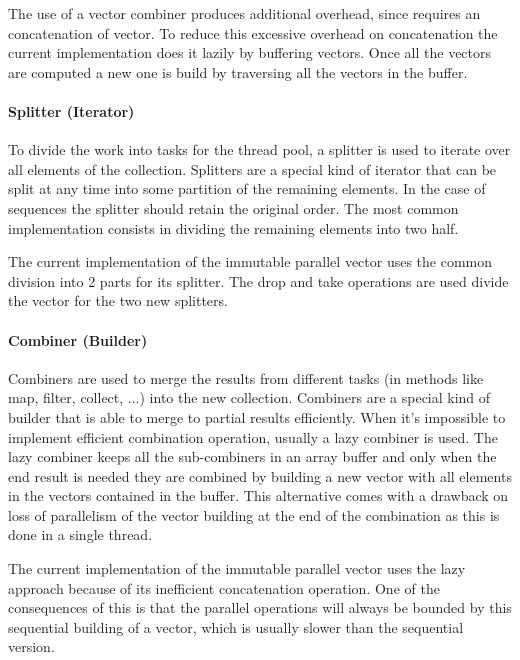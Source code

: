The use of a vector combiner produces additional overhead, since requires an concatenation of vector. To reduce this excessive overhead on concatenation the current implementation does it lazily by buffering vectors. Once all the vectors are computed a new one is build by traversing all the vectors in the buffer. 


\paragraph{Splitter (Iterator)}
To divide the work into tasks for the thread pool, a splitter is used to iterate over all elements of the collection. Splitters are a special kind of iterator that can be split at any time into some partition of the remaining elements. In the case of sequences the splitter should retain the original order. The most common implementation consists in dividing the remaining elements into two half. 

The current implementation of the immutable parallel  vector uses the common division into 2 parts for its splitter. The drop and take operations are used divide the vector for the two new splitters.


\paragraph{Combiner (Builder)}
Combiners are used to merge the results from different tasks (in methods like map, filter, collect, ...) into the new collection. Combiners are a special kind of builder that is able to merge to partial results efficiently. When it's impossible to implement efficient combination operation, usually a lazy combiner is used. The lazy combiner keeps all the sub-combiners in an array buffer and only when the end result is needed they are combined by building a new vector with all elements in the vectors contained in the buffer. This alternative comes with a drawback on loss of parallelism of the vector building at the end of the combination as this is done in a single thread. 

The current implementation of the immutable parallel vector uses the lazy approach because of its inefficient concatenation operation. One of the consequences of this is that the parallel operations will always be bounded by this sequential building of a vector, which is usually slower than the sequential version.
 

